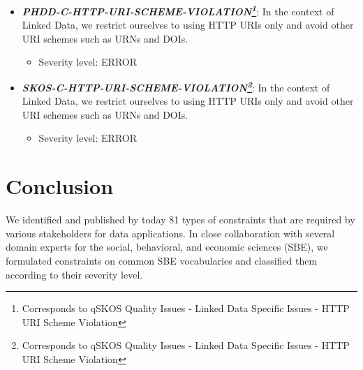 \documentclass{llncs}
\begin{document}
\begin{itemize}
	\item \textbf{\em PHDD-C-HTTP-URI-SCHEME-VIOLATION\footnote{Corresponds to qSKOS Quality Issues - Linked Data Specific Issues - HTTP URI Scheme Violation}}: 
	In the context of Linked Data, we restrict ourselves to using HTTP URIs only and avoid other URI schemes such as URNs and DOIs.
	\begin{itemize}
		\item Severity level: ERROR
	\end{itemize}
\end{itemize}

\begin{itemize}
	\item \textbf{\em SKOS-C-HTTP-URI-SCHEME-VIOLATION\footnote{Corresponds to qSKOS Quality Issues - Linked Data Specific Issues - HTTP URI Scheme Violation}}: 
	In the context of Linked Data, we restrict ourselves to using HTTP URIs only and avoid other URI schemes such as URNs and DOIs.
	\begin{itemize}
		\item Severity level: ERROR
	\end{itemize}
\end{itemize}

\section{Conclusion}

We identified and published by today 81 types of constraints  that are required by various stakeholders for data applications.
In close collaboration with several domain experts for the social, behavioral, and economic sciences (SBE), we formulated constraints on common SBE vocabularies and classified them according to their severity level.

{}

\setcounter{tocdepth}{1}
\end{document}
